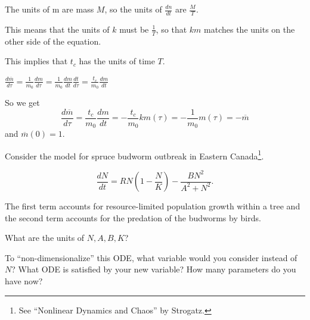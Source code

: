 \begin{solution}
\begin{slide}

\begin{parts}
	\item The units of m are mass $M$, so the units of $\frac{dn}{dt}$ are $\frac{M}{T}$.
	
	This means that the units of $k$ must be $\frac{1}{T}$, so that $km$ matches the units on the other side of the equation.
	
	This implies that $t_c$ has the units of time $T$.
	
	\item $\displaystyle\frac{d\overline{m}}{d\tau} = \frac{1}{m_0} \frac{dm}{d\tau} = \frac{1}{m_0} \frac{dm}{dt} \frac{dt}{d\tau} = \frac{t_c}{m_0} \frac{dm}{dt}$
	
	So we get 
	\[
	\frac{d\overline{m}}{d\tau} 
		= \frac{t_c}{m_0} \frac{dm}{dt} 
		= -\frac{t_c}{m_0} k m(\tau)
		= -\frac{1}{m_0} m(\tau)
		= - \overline{m}
	\]
	and $\overline{m}(0)=1$.
	
\end{parts}
\end{slide}

\end{solution}

	







\begin{slide}
\question \label{q:budworms}
	
\begin{problem}
Consider the model for spruce budworm outbreak in Eastern Canada\footnote{See ``Nonlinear Dynamics and Chaos'' by Strogatz.}.

\[
\frac{dN}{dt} = R N \left( 1 - \frac{N}{K} \right) - \frac{B N^2}{A^2 + N^2}.
\]

The first term accounts for resource-limited population growth within a tree and the second term accounts for the predation of the budworms by birds.
\end{problem}

\begin{parts}
	\item What are the units of $N, A, B, K$?
	


	\item To ``non-dimensionalize'' this ODE, what variable would you consider instead of $N$?  What ODE is satisfied by your new variable? How many parameters do you have now?
	

	
\end{parts}

\end{slide}

